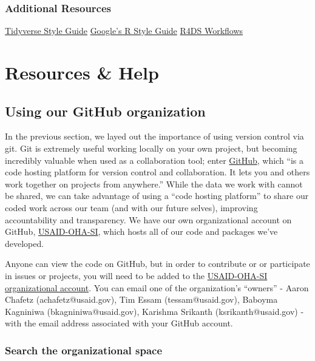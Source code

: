 \documentclass[
  letterpaper,
  DIV=11,
  numbers=noendperiod]{scrreprt}
\begin{document}
\hypertarget{additional-resources-4}{%
\section{Additional Resources}\label{additional-resources-4}}

\href{https://style.tidyverse.org/}{Tidyverse Style Guide}
\href{https://google.github.io/styleguide/Rguide.html}{Google's R Style
Guide} \href{https://r4ds.had.co.nz/workflow-scripts.html}{R4DS
Workflows}

\part{Resources \& Help}

\hypertarget{using-our-github-organization}{%
\chapter{Using our GitHub
organization}\label{using-our-github-organization}}

In the previous section, we layed out the importance of using version
control via git. Git is extremely useful working locally on your own
project, but becoming incredibly valuable when used as a collaboration
tool; enter
\href{https://docs.github.com/en/get-started/quickstart/hello-world}{GitHub},
which ``is a code hosting platform for version control and
collaboration. It lets you and others work together on projects from
anywhere.'' While the data we work with cannot be shared, we can take
advantage of using a ``code hosting platform'' to share our coded work
across our team (and with our future selves), improving accountability
and transparency. We have our own organizational account on GitHub,
\href{https://github.com/USAID-OHA-SI}{USAID-OHA-SI}, which hosts all of
our code and packages we've developed.

Anyone can view the code on GitHub, but in order to contribute or or
participate in issues or projects, you will need to be added to the
\href{https://github.com/USAID-OHA-SI}{USAID-OHA-SI organizational
account}. You can email one of the organization's ``owners'' - Aaron
Chafetz (achafetz@usaid.gov), Tim Essam (tessam@usaid.gov), Baboyma
Kagniniwa (bkagniniwa@usaid.gov), Karishma Srikanth
(ksrikanth@usaid.gov) - with the email address associated with your
GitHub account.

\hypertarget{search-the-organizational-space}{%
\section{Search the organizational
space}\label{search-the-organizational-space}}
\end{document}
